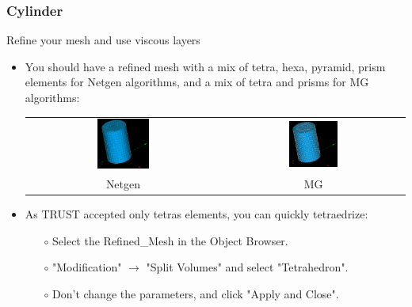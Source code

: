 \documentclass[10pt, hyperref={unicode=true,pdfusetitle, bookmarks=true,bookmarksnumbered=false,bookmarksopen=false, breaklinks=false,pdfborder={0 0 1},backref=true,colorlinks=true,linkcolor=darkblue,pageanchor}]{beamer}
\begin{document}
\begin{frame}
\frametitle{Cylinder}
\begin{block}{Refine your mesh and use viscous layers}

\begin{itemize}
\item You should have a refined mesh with a mix of tetra, hexa, pyramid, prism elements for Netgen algorithms, and a mix of tetra and prisms for MG algorithms:

\begin{center}
\begin{tabular}{cc}
\includegraphics[width=0.28\textwidth]{PICTURES/salome6a.jpg}
 & 
\includegraphics[width=0.28\textwidth]{PICTURES/salome6b.jpg}
\tabularnewline
Netgen & MG
\end{tabular}
\end{center}

\item As TRUST accepted only tetras elements, you can quickly tetraedrize:
    \begin{itemize}
    \item [$\circ$] Select the Refined\_Mesh in the Object Browser.
    \item [$\circ$] "Modification" $\rightarrow$ "Split Volumes" and select "Tetrahedron".
    \item [$\circ$] Don't change the parameters, and click "Apply and Close".
    \end{itemize}
\end{itemize}

\end{block}
\end{frame}
\end{document}
